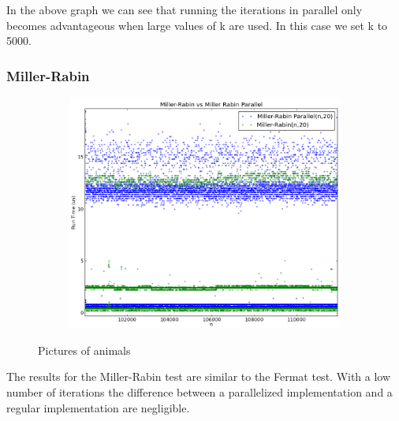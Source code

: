 \documentclass[compressed,final,notitlepage,narroweqnarray,inline,twoside,]{ieee}
\begin{document}
 In the above graph we can see that running the iterations in parallel only becomes advantageous when large values of k are used. In this case we set k to 5000.
\subsubsection{Miller-Rabin}
\begin{figure}[H]
        \centering
        \begin{subfigure}[b]{0.5\textwidth}
                \includegraphics[width=\textwidth]{../images/MR_MRP_runtime}
                \label{fig:gull}
        \end{subfigure}
        \caption{Pictures of animals}\label{fig:animals}
\end{figure}
 The results for the Miller-Rabin test are similar to the Fermat test. With a low number of iterations the difference between a parallelized implementation and a regular implementation are negligible.
\end{document}
